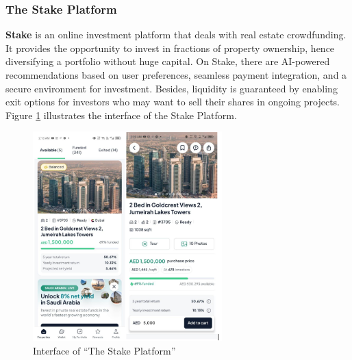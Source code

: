 
\subsubsection{The Stake Platform}

\textbf{\textcolor{primary}{Stake}} \cite{StakeWebsite} is an online investment platform that deals with real estate crowdfunding. It provides the opportunity to invest in fractions of property ownership, hence diversifying a portfolio without huge capital. On Stake, there are AI-powered recommendations based on user preferences, seamless payment integration, and a secure environment for investment. Besides, liquidity is guaranteed by enabling exit options for investors who may want to sell their shares in ongoing projects. Figure \ref{fig:stake-platform} illustrates the interface of the Stake Platform.

\newpage
\thispagestyle{empty}
\newpage

\begin{figure}[htbp]
    \centering
    \includegraphics[width=0.65\textwidth]{images/Interface-of-the Stake Platform.png}
    \caption{Interface of ``The Stake Platform''}
    \label{fig:stake-platform}
\end{figure}

